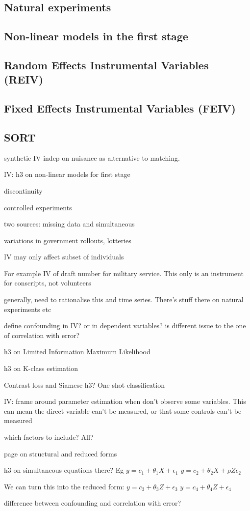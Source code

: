 
\subsection{Natural experiments}

\subsection{Non-linear models in the first stage}

\subsection{Random Effects Instrumental Variables (REIV)}

\subsection{Fixed Effects Instrumental Variables (FEIV)}

\subsection{SORT}

synthetic IV indep on nuisance as alternative to matching.

IV: h3 on non-linear models for first stage

discontinuity

controlled experiments

two sources: missing data and simultaneous

variations in government rollouts, lotteries

IV may only affect subset of individuals

For example IV of draft number for military service. This only is an instrument for conscripts, not volunteers

generally, need to rationalise this and time series. There's stuff there on natural experiments etc

define confounding in IV? or in dependent variables?
is different issue to the one of correlation with error?

h3 on Limited Information Maximum Likelihood

h3 on K-class estimation

Contrast loss and Siamese h3? One shot classification

IV: frame around parameter estimation when don't observe some variables. This can mean the direct variable can't be measured, or that some controls can't be measured

which factors to include? All?

page on structural and reduced forms

h3 on simultaneous equations there?
Eg
\(y=c_1+\theta_1 X+\epsilon_1\)
\(y=c_2+\theta_2 X+\rho Z\epsilon_2\)

We can turn this into the reduced form:
\(y=c_3+\theta_3Z+\epsilon_3\)
\(y=c_4+\theta_4Z+\epsilon_4\)

difference between confounding and correlation with error?



